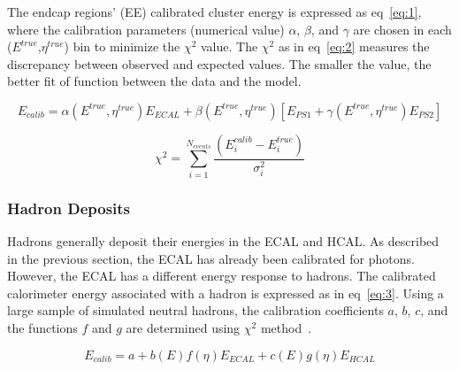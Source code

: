 The endcap regions' (EE) calibrated cluster energy is expressed as eq~\ref{eq:1},
where the calibration parameters (numerical value) $\alpha$, $\beta$, and $\gamma$ are chosen in each ($E^{true}$,$\eta^{true}$) bin to minimize the $\chi^{2}$ value.
The $\chi^{2}$ as in eq~\ref{eq:2} measures the discrepancy between observed and expected values. The smaller the value, the better fit of function between the data and the model.

\begin{equation}
E_{calib} = \alpha(E^{true},\eta^{true})E_{ECAL} + \beta(E^{true},\eta^{true})[E_{PS1}+\gamma(E^{true},\eta^{true})E_{PS2}]
\label{eq:1}
\end{equation}

\begin{equation}
\chi^{2} = \sum_{i=1}^{N_{events}}\frac{(E_{i}^{calib} - E_{i}^{true})}{\sigma_{i}^{2}}
\label{eq:2}
\end{equation}
\subsubsection{Hadron Deposits}

Hadrons generally deposit their energies in the ECAL and HCAL.
As described in the previous section, the ECAL has already been calibrated for photons.
However, the ECAL has a different energy response to hadrons.
The calibrated calorimeter energy associated with a hadron is expressed as in eq~\ref{eq:3}.
Using a large sample of simulated neutral hadrons, the calibration coefficients $a$, $b$, $c$, and the functions $f$ and $g$ are determined using $\chi^{2}$ method~\cite{PF}. 

\begin{equation}
E_{calib} = a + b(E)f(\eta)E_{ECAL} + c(E)g(\eta)E_{HCAL}
\label{eq:3}
\end{equation}
